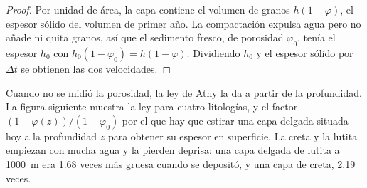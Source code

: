 \begin{proof}
Por unidad de área, la capa contiene el volumen de granos $h(1 - \varphi)$, el espesor sólido del
volumen de primer año. La compactación expulsa agua pero no añade ni quita granos, así que el sedimento
fresco, de porosidad $\varphi_0$, tenía el espesor $h_0$ con $h_0(1 - \varphi_0) = h(1 -
\varphi)$. Dividiendo $h_0$ y el espesor sólido por $\Delta t$ se obtienen las dos velocidades.
\end{proof}

Cuando no se midió la porosidad, la ley de Athy la da a partir de la profundidad. La figura siguiente muestra
la ley para cuatro litologías, y el factor $(1 - \varphi(z))/(1 - \varphi_0)$ por el que hay que estirar una capa
delgada situada hoy a la profundidad $z$ para obtener su espesor en superficie. La creta y la lutita
empiezan con mucha agua y la pierden deprisa: una capa delgada de lutita a \qty{1000}{m} era 1.68 veces
más gruesa cuando se depositó, y una capa de creta, 2.19 veces.

